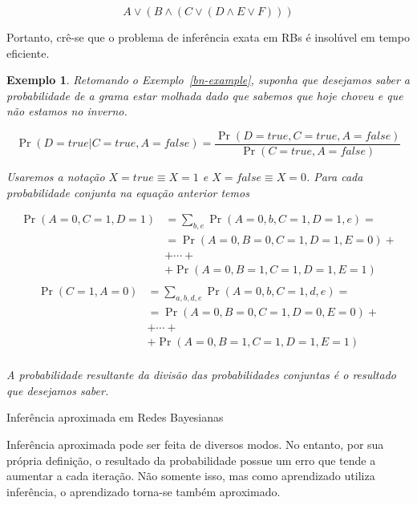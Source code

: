 \documentclass{amsart}
\makeatletter
\def\subsection{\@startsection{subsection}{3}%
  \z@{.5\linespacing\@plus.7\linespacing}{.1\linespacing}%
  {\normalfont\itshape}}
\theoremstyle{plain}
\newcounter{dummy-def}\numberwithin{dummy-def}{subsection}
\newcounter{dummy-thm}\numberwithin{dummy-thm}{subsection}
\newcounter{dummy-prop}\numberwithin{dummy-prop}{subsection}
\newcounter{dummy-ex}\numberwithin{dummy-ex}{subsection}
\newcounter{dummy-eg}\numberwithin{dummy-eg}{subsection}
\newtheorem{example}[dummy-eg]{Exemplo}
\numberwithin{equation}{subsection}
\makeatother
\begin{document}
\begin{equation*}
  A\vee(B\wedge(C\vee (D\wedge E\vee F)))
\end{equation*}

Portanto, crê-se que o problema de inferência exata em RBs é insolúvel em tempo eficiente.

\begin{example}
  Retomando o Exemplo~\ref{bn-example}, suponha que desejamos saber a probabilidade de a grama
  estar molhada dado que sabemos que hoje choveu e que não estamos no inverno.

  \begin{equation*}
    \Pr(D=true|C=true,A=false)=\frac{\Pr(D=true,C=true,A=false)}{\Pr(C=true,A=false)}
  \end{equation*}

  Usaremos a notação $X=true\equiv X=1$ e $X=false\equiv X=0$. Para cada probabilidade
  conjunta na equação anterior temos

  \begin{align*}
    \Pr(A=0,C=1,D=1)&=\sum_{b,e}\Pr(A=0,b,C=1,D=1,e)=\\
    &=\Pr(A=0,B=0,C=1,D=1,E=0)+\\
    &+\cdots+\\
    &+\Pr(A=0,B=1,C=1,D=1,E=1)\\
  \end{align*}
  \begin{align*}
    \Pr(C=1,A=0)&=\sum_{a,b,d,e}\Pr(A=0,b,C=1,d,e)=\\
    &=\Pr(A=0,B=0,C=1,D=0,E=0)+\\
    &+\cdots+\\
    &+\Pr(A=0,B=1,C=1,D=1,E=1)\\
  \end{align*}

  A probabilidade resultante da divisão das probabilidades conjuntas é o resultado que desejamos
  saber.
\end{example}

\subsection{Inferência aproximada em Redes Bayesianas}

Inferência aproximada pode ser feita de diversos modos. No entanto, por sua própria definição,
o resultado da probabilidade possue um erro que tende a aumentar a cada iteração. Não somente isso,
mas como aprendizado utiliza inferência, o aprendizado torna-se também aproximado.
\end{document}
